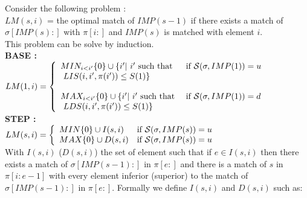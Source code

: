 \documentclass[12pt, a4paper]{article}
\newcommand{\ptext}{\pi}
\newcommand{\pmotif}{\sigma}
\newcommand{\dstep}{d}
\newcommand{\ustep}{u}
\begin{document}
			
			Consider the following problem :\\
			$LM(s,i)$ = the optimal match of 	
				$IMP(s-1)$ 
				if there exists a match of $\pmotif[IMP(s):]$ 
				with $\ptext[i:]$
				and $IMP(s)$ 
				is matched with element $i$.\\
				
			This problem can be solve by induction.\\
			
			\textbf{BASE :} \\
			$LM(1,i)= \left\{ 
					\begin{array}{l l}
					
						MIN_{i<i'}\{0\} \cup \{i' |\text{ $i'$ such that } & 
						\text{if $\mathcal{S}(\pmotif,IMP(1))=\ustep$}
						\\
						\text{ $LIS(i,i',\ptext(i')) \leq S(1)$}\}&\\			


						&\\
						
						MAX_{i<i'}\{0\} \cup \{i' |\text{ $i'$ such that } &
						\text{if $\mathcal{S}(\pmotif,IMP(1))=\dstep$} \\
						\text{ $LDS(i,i',\ptext(i')) \leq S(1)$}\}&\\			

					\end{array} \right. $\\	
		
			\textbf{STEP :} \\
			$LM(s,i)= \left\{ 
					\begin{array}{l l}
					
						MIN \{0\} \cup  I(s,i) & 
						\text{if $\mathcal{S}(\pmotif,IMP(s))=\ustep$}\\

						
						MAX \{0\} \cup  D(s,i) & 
						\text{if $\mathcal{S}(\pmotif,IMP(s))=\ustep$}\\
	
						
											
					\end{array} \right. $\\
					
			With $I(s,i)$ ($D(s,i)$) the set of element such that
			if  $e \in I(s,i)$ then there exists 
			a match of $\pmotif[IMP(s-1):]$ in $\ptext[e:]$ and
			there is a match of $s$ in $\ptext[i:e-1]$
			with every element inferior (superior) to the match of  
			$\pmotif[IMP(s-1):]$ in $\ptext[e:]$.
			Formally we define $I(s,i)$ and $D(s,i)$ such as:\\
			
\end{document}
